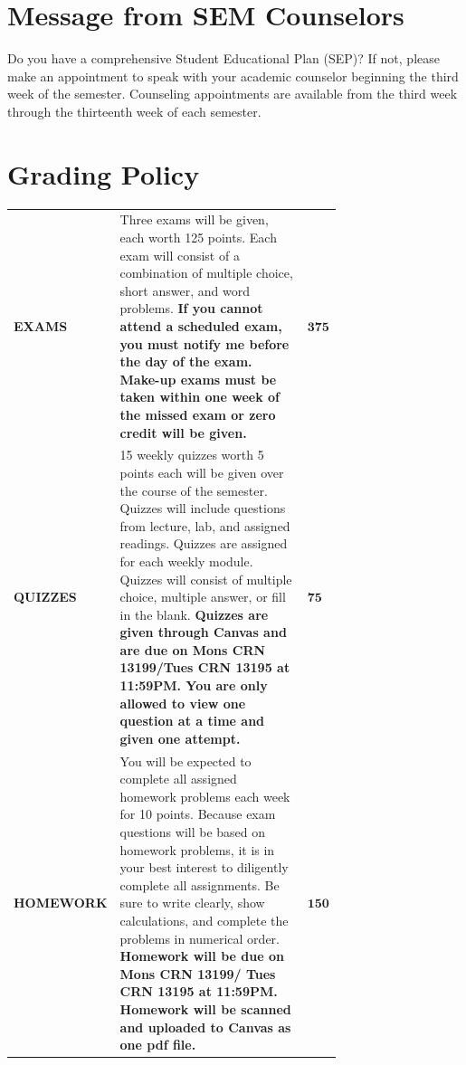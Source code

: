 \documentclass[11pt]{article}
\begin{document}
\section{Message from SEM Counselors}

Do you have a comprehensive Student Educational Plan (SEP)? If not, please make
an appointment to speak with your academic counselor beginning the third week of
the semester. Counseling appointments are available from the third week through
the thirteenth week of each semester. 

\section{Grading Policy}

\begin{table}[H]
\label{tab:grade_policy}
\begin{tabular}{|l|p{0.72\linewidth}|l|}
  \hline
  \textbf{EXAMS} & Three exams will be given, each worth 125 points. Each exam
  will consist of a combination of multiple choice, short answer, and word problems.
  \textbf{If you cannot attend a scheduled exam, you must notify me before the day of the exam.
  Make-up exams must be taken within one week of the missed exam or zero credit will be
  given.}
  & $\mathbf{375}$ \\

  \textbf{QUIZZES} & 15 weekly quizzes worth 5 points each will be given over the course of
  the semester. Quizzes will include questions from lecture, lab, and assigned readings.
  Quizzes are assigned for each weekly module. Quizzes will consist of multiple choice,
  multiple answer, or fill in the blank. \textbf{Quizzes are given through Canvas and are due on
  Mons CRN 13199/Tues CRN 13195 at 11:59PM. You are only allowed to view one question at a
  time and given one attempt.}
  & $\mathbf{75}$ \\
  
  \textbf{HOMEWORK} & You will be expected to complete all assigned homework problems each week for
  10 points. Because exam questions will be based on homework problems, it is in your best
  interest to diligently complete all assignments. Be sure to write clearly, show calculations,
  and complete the problems in numerical order. \textbf{Homework will be due on Mons CRN 13199/
  Tues CRN 13195 at 11:59PM. Homework will be scanned and uploaded to Canvas as one pdf file.}
  & $\mathbf{150}$ \\


\end{tabular}
\end{table}
\end{document}
